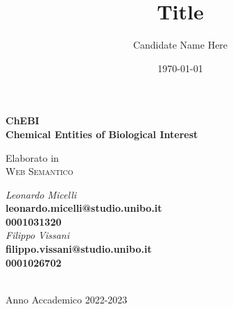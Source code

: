 \title{Title}
\author{Candidate Name Here}
\date{\today}

\begin{titlepage}
	\begin{center}

		\Huge
		\vspace{4cm}
		\textbf{
			ChEBI
			\\
			Chemical Entities of Biological Interest
		}

		\large
		\vspace{1cm}
		Elaborato in
		\\
		\textsc{Web Semantico}

		\vspace{5.5cm}
		\begin{minipage}[t]{0.64\textwidth}
			\begin{flushleft}
				\textit{Leonardo Micelli}
				\\
				\textbf{leonardo.micelli@studio.unibo.it}
				\\
				\textbf{0001031320}
				\\
				\vspace{0.4cm}
				\textit{Filippo Vissani}
				\\
				\textbf{filippo.vissani@studio.unibo.it}
				\\
				\textbf{0001026702}
			\end{flushleft}
		\end{minipage}

		\vfill
		\noindent\hrulefill
		\vspace{0.3cm}
		\Large
		\\
		Anno Accademico 2022-2023
	\end{center}
\end{titlepage}
\restoregeometry
